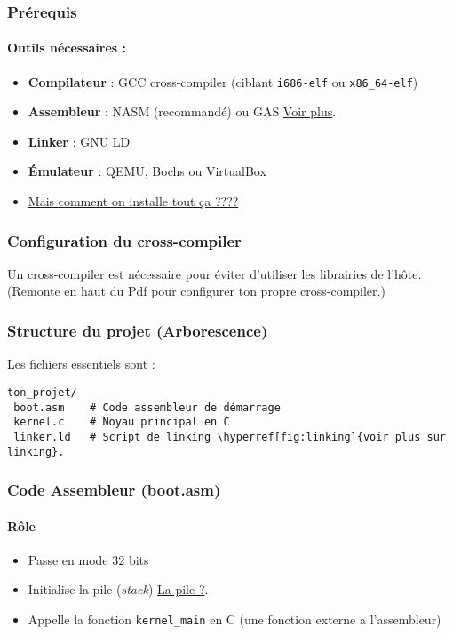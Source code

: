 \documentclass{article}
\begin{document}
\subsubsection*{Prérequis}
\paragraph{Outils nécessaires :}
\begin{itemize}
    \item \textbf{Compilateur} : GCC cross-compiler (ciblant \texttt{i686-elf} ou \texttt{x86\_64-elf})
    \item \textbf{Assembleur} : NASM  (recommandé) ou GAS   \hyperref[fig:nasm]{Voir plus}.

    \item \textbf{Linker} : GNU LD
    \item \textbf{Émulateur} : QEMU, Bochs ou VirtualBox
    \item \hyperref[fig:tutoinstalltt]{Mais comment on installe tout ça ????}
\end{itemize}

\subsubsection*{Configuration du cross-compiler}
Un cross-compiler est nécessaire pour éviter d'utiliser les librairies de l'hôte.\\
    (Remonte en haut du Pdf pour configurer ton propre cross-compiler.)

\subsubsection*{Structure du projet (Arborescence)}
Les fichiers essentiels sont :

\begin{verbatim}
ton_projet/
 boot.asm    # Code assembleur de démarrage
 kernel.c    # Noyau principal en C
 linker.ld   # Script de linking \hyperref[fig:linking]{voir plus sur linking}.
\end{verbatim}

\subsubsection*{Code Assembleur (boot.asm)}
\paragraph{Rôle}
\begin{itemize}
    \item Passe en mode 32 bits
    \item Initialise la pile (\textit{stack}) \hyperref[fig:pilenasm]{La pile ?}.
    \item Appelle la fonction \texttt{kernel\_main} en C (une fonction externe a l'assembleur)
\end{itemize}
\newpage
\end{document}
